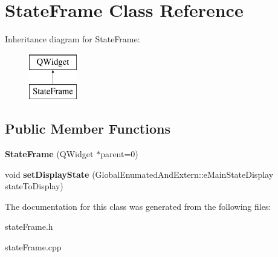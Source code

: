 \hypertarget{class_state_frame}{}\section{State\+Frame Class Reference}
\label{class_state_frame}
Inheritance diagram for State\+Frame\+:\begin{figure}[H]
\begin{center}
\leavevmode
\includegraphics[height=2.000000cm]{class_state_frame}
\end{center}
\end{figure}
\subsection*{Public Member Functions}
\begin{DoxyCompactItemize}
\item 
\mbox{\label{class_state_frame_a5af202e8a64904191de6d2798e406041}} 
{\bfseries State\+Frame} (Q\+Widget $\ast$parent=0)
\item 
\mbox{\label{class_state_frame_a84cbb8d6f0e1c70adebdc3d4e22a3a08}} 
void {\bfseries set\+Display\+State} (Global\+Enumated\+And\+Extern\+::e\+Main\+State\+Display state\+To\+Display)
\end{DoxyCompactItemize}


The documentation for this class was generated from the following files\+:\begin{DoxyCompactItemize}
\item 
state\+Frame.\+h\item 
state\+Frame.\+cpp\end{DoxyCompactItemize}
